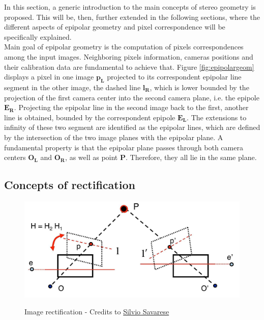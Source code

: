 In this section, a generic introduction to the main concepts of stereo geometry is proposed. 
This will be, then, further extended in the following sections, where the different aspects of epipolar geometry and pixel correspondence will be specifically explained.\\
Main goal of epipolar geometry is the computation of pixels correspondences among the input images. 
Neighboring pixels information, cameras positions and their calibration data are fundamental to achieve that.
Figure \ref{fig:epipolargeom} displays a pixel in one image $\mathbf{p_L}$ projected to its correspondent epipolar line segment in the other image, the dashed line $\mathbf{l_R}$, which is lower bounded by the projection of the first camera center into the second camera plane, i.e. the epipole $\mathbf{E_R}$. 
Projecting the epipolar line in the second image back to the first, another line is obtained, bounded by the correspondent epipole $\mathbf{E_L}$. 
The extensions to infinity of these two segment are identified as the epipolar lines, which are defined by the intersection of the two image planes with the epipolar plane.
A fundamental property is that the epipolar plane passes through both camera centers $\mathbf{O_L}$ and $\mathbf{O_R}$, as well as point $\mathbf{P}$. 
Therefore, they all lie in the same plane.

\subsection{Concepts of rectification}
\label{subsection:rectification-basics}

\begin{figure}[t]
	\begin{center}
		{\includegraphics[width=.8\textwidth, height=5cm, keepaspectratio]{images/rectification.jpg}}
\caption{Image rectification - Credits to \href{https://commons.wikimedia.org/wiki/File:Lecture_1027_stereo_01.jpg}{Silvio Savarese}}
\label{fig:rectification}
	\end{center}
\end{figure}

